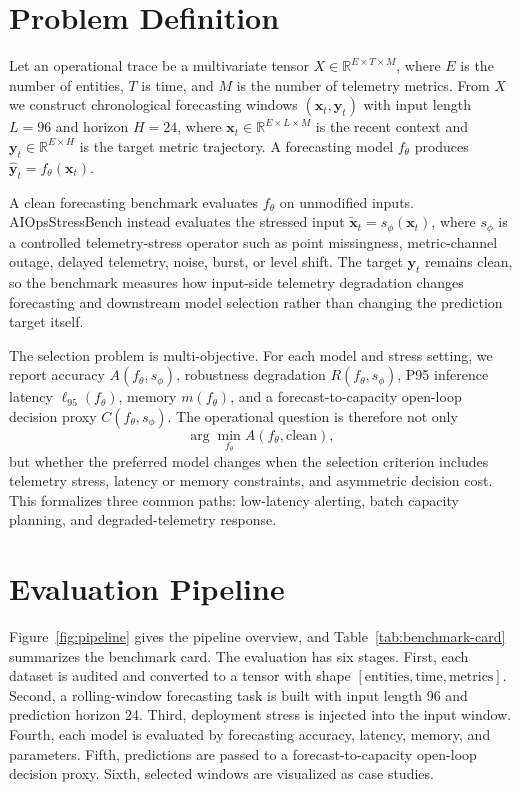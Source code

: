 \documentclass[conference]{IEEEtran}
\begin{document}


\section{Problem Definition}

Let an operational trace be a multivariate tensor $X\in\mathbb{R}^{E\times T\times M}$, where $E$ is the number of entities, $T$ is time, and $M$ is the number of telemetry metrics. From $X$ we construct chronological forecasting windows $(\mathbf{x}_t,\mathbf{y}_t)$ with input length $L=96$ and horizon $H=24$, where $\mathbf{x}_t\in\mathbb{R}^{E\times L\times M}$ is the recent context and $\mathbf{y}_t\in\mathbb{R}^{E\times H}$ is the target metric trajectory. A forecasting model $f_\theta$ produces $\hat{\mathbf{y}}_t=f_\theta(\mathbf{x}_t)$.

A clean forecasting benchmark evaluates $f_\theta$ on unmodified inputs. AIOpsStressBench instead evaluates the stressed input $\tilde{\mathbf{x}}_t=s_\phi(\mathbf{x}_t)$, where $s_\phi$ is a controlled telemetry-stress operator such as point missingness, metric-channel outage, delayed telemetry, noise, burst, or level shift. The target $\mathbf{y}_t$ remains clean, so the benchmark measures how input-side telemetry degradation changes forecasting and downstream model selection rather than changing the prediction target itself.

The selection problem is multi-objective. For each model and stress setting, we report accuracy $A(f_\theta,s_\phi)$, robustness degradation $R(f_\theta,s_\phi)$, P95 inference latency $\ell_{95}(f_\theta)$, memory $m(f_\theta)$, and a forecast-to-capacity open-loop decision proxy $C(f_\theta,s_\phi)$. The operational question is therefore not only
\begin{equation}
\arg\min_{f_\theta} A(f_\theta,\mathrm{clean}),
\end{equation}
but whether the preferred model changes when the selection criterion includes telemetry stress, latency or memory constraints, and asymmetric decision cost. This formalizes three common paths: low-latency alerting, batch capacity planning, and degraded-telemetry response.

\section{Evaluation Pipeline}

Figure~\ref{fig:pipeline} gives the pipeline overview, and Table~\ref{tab:benchmark-card} summarizes the benchmark card. The evaluation has six stages. First, each dataset is audited and converted to a tensor with shape $[\text{entities}, \text{time}, \text{metrics}]$. Second, a rolling-window forecasting task is built with input length 96 and prediction horizon 24. Third, deployment stress is injected into the input window. Fourth, each model is evaluated by forecasting accuracy, latency, memory, and parameters. Fifth, predictions are passed to a forecast-to-capacity open-loop decision proxy. Sixth, selected windows are visualized as case studies.
\end{document}
